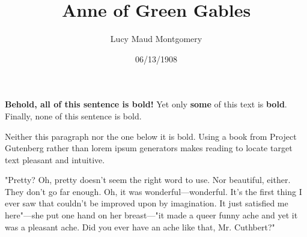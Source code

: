\documentclass[a4paper]{article}
\title{Anne of Green Gables}
\author{Lucy Maud Montgomery}
\date{06/13/1908}
\begin{document}
\maketitle

\textbf{Behold, all of this sentence is bold!} Yet only \textbf{some} of this text is \textbf{bold}. Finally, none of this sentence is bold.

Neither this paragraph nor the one below it is bold. Using a book from Project Gutenberg rather than lorem ipsum generators makes reading to locate target text pleasant and intuitive.

"Pretty? Oh, pretty doesn’t seem the right word to use. Nor beautiful, either. They don’t go far enough. Oh, it was wonderful---wonderful. It’s the first thing I ever saw that couldn’t be improved upon by imagination. It just satisfied me here"---she put one hand on her breast---"it made a queer funny ache and yet it was a pleasant ache. Did you ever have an ache like that, Mr. Cuthbert?"
\end{document}
